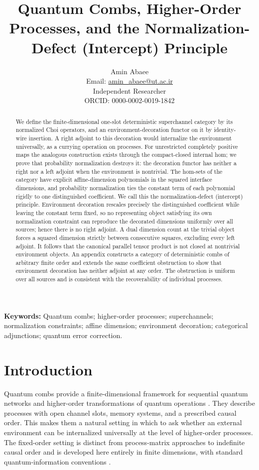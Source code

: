 \documentclass[11pt,a4paper]{article}
\title{\textbf{Quantum Combs, Higher-Order Processes, and the Normalization-Defect (Intercept) Principle}}
\author{Amin Abaee\\
\small Email: \href{mailto:amin_abaee@ut.ac.ir}{amin\_abaee@ut.ac.ir}\\
\small Independent Researcher\\
\small ORCID: 0000-0002-0019-1842}
\date{}
\theoremstyle{definition}
\theoremstyle{plain}
\theoremstyle{remark}
\newcommand{\keywords}{\noindent\textbf{Keywords:} Quantum combs; higher-order processes; superchannels; normalization constraints; affine dimension; environment decoration; categorical adjunctions; quantum error correction.}
\begin{document}
\maketitle

\begin{abstract}
We define the finite-dimensional one-slot deterministic superchannel
category by its normalized Choi operators, and an environment-decoration
functor on it by identity-wire insertion. A right adjoint to this
decoration would internalize the environment universally, as a currying
operation on processes. For unrestricted completely positive maps the
analogous construction exists through the compact-closed internal hom;
we prove that probability normalization destroys it: the decoration
functor has neither a right nor a left adjoint when the environment is
nontrivial. The hom-sets of the category have explicit affine-dimension
polynomials in the squared interface dimensions, and probability
normalization ties the constant term of each polynomial rigidly to one
distinguished coefficient. We call this the normalization-defect
(intercept) principle. Environment decoration rescales precisely the
distinguished coefficient while leaving the constant term fixed, so no
representing object satisfying its own normalization constraint can
reproduce the decorated dimensions uniformly over all sources; hence
there is no right adjoint. A dual dimension count at the trivial object
forces a squared dimension strictly between consecutive squares,
excluding every left adjoint. It follows that the canonical parallel
tensor product is not closed at nontrivial environment objects. An
appendix constructs a category of deterministic combs of arbitrary
finite order and extends the same coefficient obstruction to show that
environment decoration has neither adjoint at any order. The obstruction
is uniform over all sources and is consistent with the recoverability of
individual processes.
\end{abstract}

\keywords

\section{Introduction}

Quantum combs provide a finite-dimensional framework for sequential quantum networks and higher-order transformations of quantum operations \cite{chiribella2008,chiribella2009,chiribella2013}. They describe processes with open channel slots, memory systems, and a prescribed causal order. This makes them a natural setting in which to ask whether an external environment can be internalized universally at the level of higher-order processes. The fixed-order setting is distinct from process-matrix approaches to indefinite causal order \cite{oreshkov2012} and is developed here entirely in finite dimensions, with standard quantum-information conventions \cite{watrous2018}.
\end{document}

